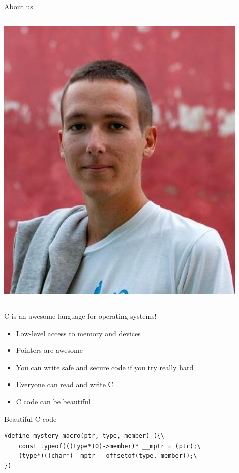 \documentclass[NET,english,aspectratio=169,notitleframe]{tumbeamer}
\begin{document}
\begin{frame}{About us}
\begin{columns}
\begin{column}{0.2\textwidth}
\includegraphics[width=0.9\textwidth]{pics/simon.jpg}\\
\end{column}
\end{columns}
\end{frame}



\begin{frame}{C is an awesome language for operating systems!}
\begin{itemize}
\item Low-level access to memory and devices
\item Pointers are awesome
\item You can write safe and secure code if you try really hard
\item Everyone can read and write C
\item C code can be beautiful
\end{itemize}
\end{frame}




\begin{frame}[fragile]{Beautiful C code}
\begin{verbatim}
#define mystery_macro(ptr, type, member) ({\
	const typeof(((type*)0)->member)* __mptr = (ptr);\
	(type*)((char*)__mptr - offsetof(type, member));\
})
\end{verbatim}
\end{frame}
\end{document}
